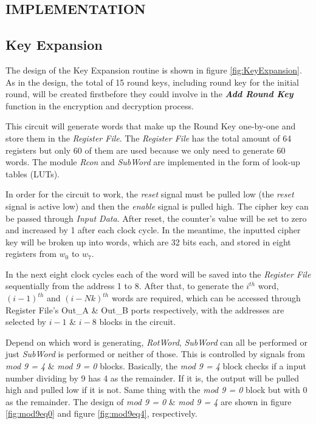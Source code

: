 \documentclass[a4paper, 10pt]{article}
\begin{document}
        \begin{multicols}{2}
        \section{IMPLEMENTATION}

            \subsection{Key Expansion}

            The design of the Key Expansion routine is shown in figure \ref{fig:KeyExpansion}. As in the design, the total of 15 round keys, including round key for the initial round, will be created firstbefore they could involve in the \textbf{\textit{Add Round Key}} function in the encryption and decryption process.
            
            This circuit will generate words that make up the Round Key one-by-one and store them in the \textit{Register File}. The \textit{Register File} has the total amount of 64 registers but only 60 of them are used because we only need to generate 60 words. The module \textit{Rcon} and \textit{SubWord} are implemented in the form of look-up tables (LUTs).

            In order for the circuit to work, the \textit{reset} signal must be pulled low (the \textit{reset} signal is active low) and then the \textit{enable} signal is pulled high. The cipher key can be passed through \textit{Input Data}. After reset, the counter's value will be set to zero and increased by 1 after each clock cycle. In the meantime, the inputted cipher key will be broken up into words, which are 32 bits each, and stored in eight registers from $w_{0}$ to $w_{7}$.
            
            In the next eight clock cycles each of the word will be saved into the \textit{Register File} sequentially from the address 1 to 8. After that, to generate the $i^{th}$ word, $(i-1)^{th}$ and $(i-Nk)^{th}$ words are required, which can be accessed through Register File's Out\_A \& Out\_B ports respectively, with the addresses are selected by $i-1$ \& $i-8$ blocks in the circuit.
            
            Depend on which word is generating, \textit{RotWord}, \textit{SubWord} can all be performed or just \textit{SubWord} is performed or neither of those. This is controlled by signals from \textit{mod 9 = 4} \& \textit{mod 9 = 0} blocks. Basically, the \textit{mod 9 = 4} block checks if a input number dividing by 9 has 4 as the remainder. If it is, the output will be pulled high and pulled low if it is not. Same thing with the \textit{mod 9 = 0} block but with 0 as the remainder. The design of \textit{mod 9 = 0} \& \textit{mod 9 = 4} are shown in figure \ref{fig:mod9eq0} and figure \ref{fig:mod9eq4}, respectively.
            

\end{multicols}
\end{document}
